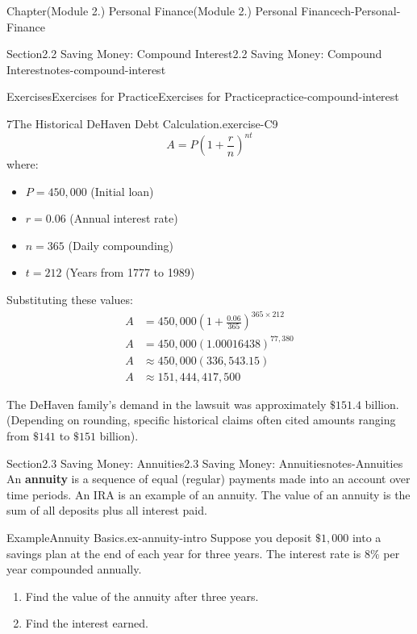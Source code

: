 \documentclass[oneside,10pt,]{book}
\newcommand{\ptxlistdisc}{\raisebox{0.3ex}{\textbullet}}
\newcommand{\terminology}[1]{\textbf{#1}}
\newcommand{\amp}{&}
\begin{document}
\begin{chapterptx}{Chapter}{(Module 2.) Personal Finance}{}{(Module 2.) Personal Finance}{}{}{ch-Personal-Finance}
\begin{sectionptx}{Section}{2.2 Saving Money: Compound Interest}{}{2.2 Saving Money: Compound Interest}{}{}{notes-compound-interest}
\begin{exercises-subsection-numberless}{Exercises}{Exercises for Practice}{}{Exercises for Practice}{}{}{practice-compound-interest}
\begin{divisionexercise}{7}{The Historical DeHaven Debt Calculation.}{}{exercise-C9}
\begin{equation*}
A = P\left(1 + \frac{r}{n}\right)^{nt}
\end{equation*}
where:%
\begin{itemize}[label=\ptxlistdisc]
\item{}\(P = 450,000\) (Initial loan)%
\item{}\(r = 0.06\) (Annual interest rate)%
\item{}\(n = 365\) (Daily compounding)%
\item{}\(t = 212\) (Years from 1777 to 1989)%
\end{itemize}
%
\par
Substituting these values:%
\begin{align*}
A \amp = 450,000\left(1 + \frac{0.06}{365}\right)^{365 \times 212}\\
A \amp = 450,000(1.00016438)^{77,380}\\
A \amp \approx 450,000(336,543.15)\\
A \amp \approx 151,444,417,500
\end{align*}
%
\par
The DeHaven family's demand in the lawsuit was approximately \(\$151.4\) billion. (Depending on rounding, specific historical claims often cited amounts ranging from \(\$141\) to \(\$151\) billion).%
\end{divisionexercise}%
\end{exercises-subsection-numberless}
\end{sectionptx}
%
%
\typeout{************************************************}
\typeout{************************************************}
%
\begin{sectionptx}{Section}{2.3 Saving Money: Annuities}{}{2.3 Saving Money: Annuities}{}{}{notes-Annuities}
An \terminology{annuity} is a sequence of equal (regular) payments made into an account over time periods. An IRA is an example of an annuity. The value of an annuity is the sum of all deposits plus all interest paid.%
\begin{example}{Example}{Annuity Basics.}{ex-annuity-intro}%
Suppose you deposit \(\$1,000\) into a savings plan at the end of each year for three years. The interest rate is \(8\%\) per year compounded annually.%
\begin{enumerate}[label={\arabic*}]
\item{}Find the value of the annuity after three years.%
\item{}Find the interest earned.%
\end{enumerate}

\end{example}
\end{sectionptx}
\end{chapterptx}
\end{document}
